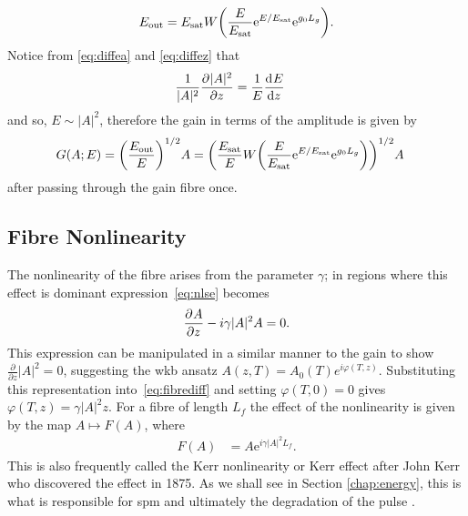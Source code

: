 \begin{align*}
E_{\textrm{out}} = \Es W \left( \frac{E}{\Es} \textrm{e}^{E/\Es} \textrm{e}^{g_0 L_g} \right).
\end{align*}
Notice from \eqref{eq:diffea} and \eqref{eq:diffez} that
\begin{align*}
\frac{1}{|A|^2}\frac{\partial^{}|A|^2}{\partial{z}^{}} &= \frac{1}{E}\frac{\textrm{d}^{}E}{\textrm{d}{z}^{}}
\end{align*}
and so, $E \sim |A|^2$, therefore the gain in terms of the amplitude is given by
\begin{align*}
G(A;E) &= \left(\frac{E_{\textrm{out}}}{E}\right)^{1/2}A = \left( \frac{\Es}{E} W \left( \frac{E}{\Es} \textrm{e}^{E/\Es} \textrm{e}^{g_0 L_g} \right) \right)^{1/2} A
\end{align*}
after passing through the gain fibre once.

\subsection{Fibre Nonlinearity}
The nonlinearity of the fibre arises from the parameter $\gamma$; in regions where this effect is dominant expression~\eqref{eq:nlse} becomes
\begin{align}
\label{eq:fibrediff}
	\frac{\partial^{}A}{\partial{z}^{}} - i \gamma |A|^2 A = 0.
\end{align}
This expression can be manipulated in a similar manner to the gain to show $\frac{\partial}{\partial z} |A|^2 = 0$, suggesting the \acrshort{wkb} ansatz $A(z,T) = A_0(T) e^{i \varphi(T,z)}$. Substituting this representation into~\eqref{eq:fibrediff} and setting $\varphi(T,0)=0$ gives $\varphi(T,z) = \gamma |A|^2 z$. For a fibre of length $L_f$ the effect of the nonlinearity is given by the map $A \mapsto F(A)$, where
\begin{align*}
F(A) &= A \textrm{e}^{i \gamma |A|^2 L_f}.
\end{align*}
This is also frequently called the Kerr nonlinearity or Kerr effect after John Kerr who discovered the effect in 1875. As we shall see in Section \ref{chap:energy}, this is what is responsible for \acrlong{spm} and ultimately the degradation of the pulse \cite{desurvire, dunlop, martinez1984, tamura1996}.


